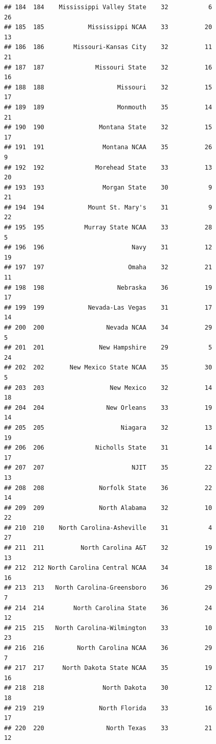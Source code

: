\documentclass[]{book}
\begin{document}
\begin{verbatim}
## 184  184    Mississippi Valley State    32           6            26
## 185  185            Mississippi NCAA    33          20            13
## 186  186        Missouri-Kansas City    32          11            21
## 187  187              Missouri State    32          16            16
## 188  188                    Missouri    32          15            17
## 189  189                    Monmouth    35          14            21
## 190  190               Montana State    32          15            17
## 191  191                Montana NCAA    35          26             9
## 192  192              Morehead State    33          13            20
## 193  193                Morgan State    30           9            21
## 194  194            Mount St. Mary's    31           9            22
## 195  195           Murray State NCAA    33          28             5
## 196  196                        Navy    31          12            19
## 197  197                       Omaha    32          21            11
## 198  198                    Nebraska    36          19            17
## 199  199            Nevada-Las Vegas    31          17            14
## 200  200                 Nevada NCAA    34          29             5
## 201  201               New Hampshire    29           5            24
## 202  202       New Mexico State NCAA    35          30             5
## 203  203                  New Mexico    32          14            18
## 204  204                 New Orleans    33          19            14
## 205  205                     Niagara    32          13            19
## 206  206              Nicholls State    31          14            17
## 207  207                        NJIT    35          22            13
## 208  208               Norfolk State    36          22            14
## 209  209               North Alabama    32          10            22
## 210  210    North Carolina-Asheville    31           4            27
## 211  211          North Carolina A&T    32          19            13
## 212  212 North Carolina Central NCAA    34          18            16
## 213  213   North Carolina-Greensboro    36          29             7
## 214  214        North Carolina State    36          24            12
## 215  215   North Carolina-Wilmington    33          10            23
## 216  216         North Carolina NCAA    36          29             7
## 217  217     North Dakota State NCAA    35          19            16
## 218  218                North Dakota    30          12            18
## 219  219               North Florida    33          16            17
## 220  220                 North Texas    33          21            12

\end{verbatim}
\end{document}
